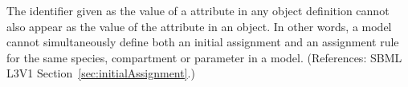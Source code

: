 The identifier given as the value of a  attribute in any
\InitialAssignment object definition cannot also appear as the value of the
 attribute in an \AssignmentRule object.  In other words, a
model cannot simultaneously define both an initial assignment and an
assignment rule for the same species, compartment or parameter in a model.
(References: SBML L3V1 Section~\ref{sec:initialAssignment}.)
